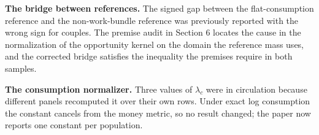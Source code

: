 \textbf{The bridge between references.} The signed gap between the flat-consumption reference and the non-work-bundle reference was previously reported with the wrong sign for couples. The premise audit in Section 6 locates the cause in the normalization of the opportunity kernel on the domain the reference mass uses, and the corrected bridge satisfies the inequality the premises require in both samples.

\textbf{The consumption normalizer.} Three values of \(\lambda_c\) were in circulation because different panels recomputed it over their own rows. Under exact log consumption the constant cancels from the money metric, so no result changed; the paper now reports one constant per population.

